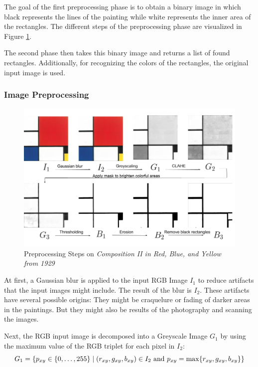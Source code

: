 \documentclass[serif,article,noparskip]{agse-thesis}
\begin{document}
The goal of the first preprocessing phase is to obtain a binary image in which
black represents the lines of the painting while white represents the inner area
of the rectangles. The different steps of the preprocessing phase are visualized
in Figure \ref{fig:preprocessing}.

The second phase then takes this binary image and returns a list of found
rectangles. Additionally, for recognizing the colors of the rectangles, the
original input image is used.

\subsubsection{Image Preprocessing} \label{preprocessing}

\begin{figure}
  \includegraphics[width=\linewidth]{images/preprocessing_steps.png}
  \caption{Preprocessing Steps on \textit{Composition II in Red, Blue, and Yellow
  from 1929}}
  \label{fig:preprocessing}
\end{figure}

At first, a Gaussian blur is applied to the input RGB Image $I_1$ to reduce
artifacts that the input images might include. The result of the blur is $I_2$.
These artifacts have several possible origins: They might be craquelure or
fading of darker areas in the paintings. But they might also be results of the
photography and scanning the images.

Next, the RGB input image is decomposed into a Greyscale Image $G_1$ by using
the maximum value of the RGB triplet for each pixel in $I_2$:
\begin{equation}
G_1 = \{p_{xy} \in \{0,\ldots,255\} \mid (r_{xy},g_{xy},b_{xy})\in I_2\text{ and }p_{xy}=\max\{r_{xy},g_{xy},b_{xy}\}\}\\
\end{equation}
\end{document}
